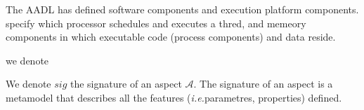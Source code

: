 The AADL has defined software components and execution platform components. specify which processor schedules and executes a thred, and memeory components in which executable code (process components) and data reside.

 we denote 






We denote $sig$ the signature of an aspect $\mathcal{A}$. The signature of an aspect is a metamodel that describes all the features (\textit{i.e.}parametres, properties) defined.